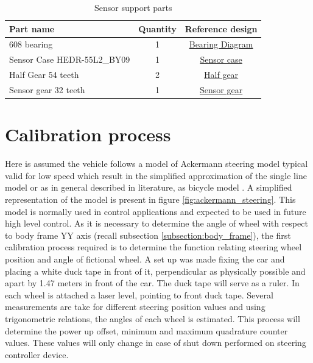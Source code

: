 \begin{table}[!hb]
    \centering
	\begin{tabular}{lcc}
		\toprule
		\textbf{Part name} & \textbf{Quantity} & \textbf{Reference design}\\
		\midrule
		608 bearing & 1 & \hyperref[draw:bearing]{Bearing Diagram}\\
		Sensor Case HEDR-55L2\_BY09 & 1 & \hyperref[draw:sensor-case]{Sensor case}\\
        Half Gear 54 teeth & 2 & \hyperref[draw:half-gear]{Half gear}\\
        Sensor gear 32 teeth & 1 & \hyperref[draw:sensor-gear]{Sensor gear}\\
		\bottomrule
	\end{tabular}
\caption{Sensor support parts}
\label{tab:sensor_support_parts}
\end{table}



\section{Calibration process}
Here is assumed the vehicle follows a model of Ackermann steering model typical valid for low speed which result in the simplified approximation of the single line model or as in general described in literature, as bicycle model\cite{Snider2009} \cite{Navigation_System_Design}. A simplified representation of the model is present in figure \ref{fig:ackermann_steering}. This model is normally used in control applications and expected to be used in future high level control. As it is necessary to determine the angle of wheel with respect to body frame YY axis (recall subsection \ref{subsection:body_frame}), the first calibration process required is to determine the function relating steering wheel position and angle of fictional wheel. A set up was made fixing the car and placing a white duck tape in front of it, perpendicular as physically possible and apart by 1.47 meters in front of the car. The duck tape will serve as a ruler. In each wheel is attached a laser level, pointing to front duck tape. Several measurements are take for different steering position values and using trigonometric relations, the angles of each wheel is estimated. 
This process will determine the power up offset, minimum and maximum quadrature counter values. These values will only change in case of shut down performed on steering controller device.

